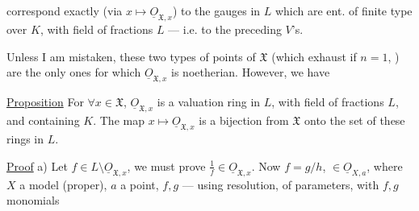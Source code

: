 correspond exactly (via $x\longmapsto\underline{O}_{\mathfrak X,x}$) to the gauges in $L$ which are ent. of finite type over $K$, with field of fractions $L$ --- i.e. to the preceding $V$'s.

Unless I am mistaken, these two types of points of $\mathfrak X$ (which exhaust  if $n=1$,\unsure{)} ) are the only ones for which $\underline{O}_{\mathfrak X,x}$ is noetherian. However, we have

\uline{Proposition} For $\forall x\in\mathfrak X$, $\underline{O}_{\mathfrak X,x}$ is a valuation ring in $L$, with field of fractions $L$, and containing $K$. The map $x\longmapsto\underline{O}_{\mathfrak X,x}$ is a bijection from $\mathfrak X$ onto the set of these rings in $L$.

\uline{Proof} a) Let $f\in L\setminus\underline{O}_{\mathfrak X,x}$, we must prove $\frac1f\in\underline{O}_{\mathfrak X,x}$. Now $f=g/h$, $\in\underline{O}_{X,a}$, where $X$ a  model (proper), $a$ a point, $f,g$  --- using resolution,   of parameters, with $f,g$ monomials
